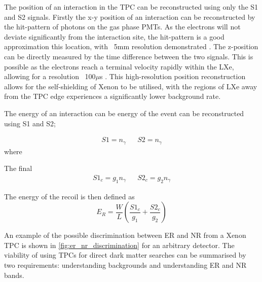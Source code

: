 \par
The position of an interaction in the TPC can be reconstructed using only the S1 and S2 signals.
Firstly the x-y position of an interaction can be reconstructed by the hit-pattern of photons on the gas phase PMTs. 
As the electrons will not deviate significantly from the interaction site, the hit-pattern is a good approximation this location, with ~5mm resolution demonstrated \cite{lux_position_reconstruction_ref}.
The z-position can be directly measured by the time difference between the two signals.
This is possible as the electrons reach a terminal velocity rapidly within the LXe, allowing for a resolution ~100$\mu$s \cite{LZ_TechnicalDesignReview_ref}.
This high-resolution position reconstruction allows for the self-shielding of Xenon to be utilised, with the regions of LXe away from the TPC edge experiences a significantly lower background rate.

\par
The energy of an interaction can be energy of the event can be reconstructed using S1 and S2;


\begin{align}
    S1 = n_\gamma && S2 = n_\gamma
\end{align}
where 

\par
The final 
\begin{align}
    S1_c = g_1 n_\gamma && S2_c = g_2 n_\gamma
\end{align}

\par
The energy of the recoil is then defined as
\begin{equation}
    E_R = \frac{W}{L}(\frac{S1_c}{g_1} + \frac{S2_c}{g_2})
\end{equation}


\par
An example of the possible discrimination between ER and NR from a Xenon TPC is shown in \autoref{fig:er_nr_discrimination} for an arbitrary detector.
The viability of using TPCs for direct dark matter searches can be summarised by two requirements: understanding backgrounds and understanding ER and NR bands.


